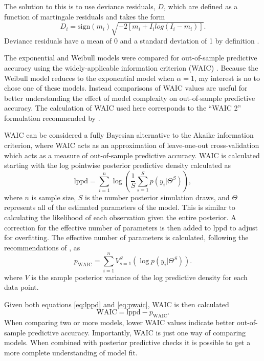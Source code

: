 \documentclass[12pt,letterpaper]{article}
\begin{document}
The solution to this is to use deviance residuals, \(D\), which are defined as a function of martingale residuals and takes the form
\begin{equation}
  D_{i} = \text{sign}(m_{i}) \sqrt{-2[m_{i} + I_{i}log(I_{i} - m_{i})]}.
\end{equation}
Deviance residuals have a mean of 0 and a standard deviation of 1 by definition \citep{Klein2003}.

The exponential and Weibull models were compared for out-of-sample predictive accuracy using the widely-applicable information criterion (WAIC) \citep{Watanabe2010a}. Because the Weibull model reduces to the exponential model when \(\alpha = 1\), my interest is no to chose one of these models. Instead comparisons of WAIC values are useful for better understanding the effect of model complexity on out-of-sample predictive accuracy. The calculation of WAIC used here corresponds to the ``WAIC 2'' formulation recommended by \citet{Gelman2013d}.

WAIC can be considered a fully Bayesian alternative to the Akaike information criterion, where WAIC acts as an approximation of leave-one-out cross-validation which acts as a measure of out-of-sample predictive accuracy. WAIC is calculated starting with the log pointwise posterior predictive density calculated as
\begin{equation}
  \mathrm{lppd} = \sum_{i = 1}^{n} \log \left(\frac{1}{S} \sum_{s = 1}^{S} p(y_{i}|\Theta^{S})\right),
  \label{eq:lppd}
\end{equation}
where \(n\) is sample size, \(S\) is the number posterior simulation draws, and \(\Theta\) represents all of the estimated parameters of the model. This is similar to calculating the likelihood of each observation given the entire posterior. A correction for the effective number of parameters is then added to lppd to adjust for overfitting. The effective number of parameters is calculated, following the recommendations of \citet{Gelman2013d}, as
\begin{equation}
  p_{\mathrm{WAIC}} = \sum_{i = 1}^{n} V_{s = 1}^{S} (\log p(y_{i}|\Theta^{S})).
  \label{eq:pwaic}
\end{equation}
where \(V\) is the sample posterior variance of the log predictive density for each data point.

Given both equations \ref{eq:lppd} and \ref{eq:pwaic}, WAIC is then calculated
\begin{equation}
  \mathrm{WAIC} = \mathrm{lppd} - p_{\mathrm{WAIC}}.
  \label{eq:waic}
\end{equation}
When comparing two or more models, lower WAIC values indicate better out-of-sample predictive accuracy. Importantly, WAIC is just one way of comparing models. When combined with posterior predictive checks it is possible to get a more complete understanding of model fit.
\end{document}
